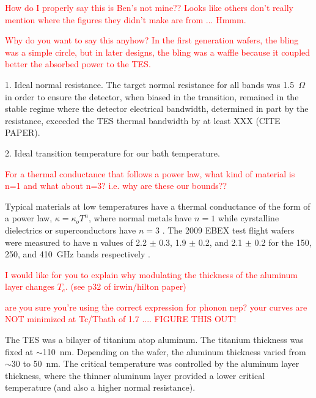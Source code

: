 \textcolor{red}{How do I properly say this is Ben's not mine?? Looks like others don't really mention where the figures they didn't make are from ... Hmmm.}

\textcolor{red}{Why do you want to say this anyhow? In the first generation wafers, the bling was a simple circle, but in later designs, the bling was a waffle because it coupled better the absorbed power to the \ac{TES}.}



1. Ideal normal resistance.  
The target normal resistance for all bands was 1.5~$\Omega$ in order to ensure the detector, when biased in the transition, remained in the stable regime where the detector electrical bandwidth, determined in part by the resistance, exceeded the \ac{TES} thermal bandwidth by at least XXX (CITE PAPER). 

2. Ideal transition temperature for our bath temperature. 


\textcolor{red}{For a thermal conductance that follows a power law, what kind of material is n=1 and what about n=3? i.e. why are these our bounds??}

Typical materials at low temperatures have a thermal conductance of the form of a power law, $\kappa = \kappa_o T^n$, where %
normal metals have $n=1$ while cyrstalline dielectrics or superconductors have $n=3$ \cite{Mather1982}. 
The 2009 \ac{EBEX} test flight wafers were measured to have n values of 2.2 $\pm$ 0.3, 1.9 $\pm$ 0.2, and 2.1 $\pm$ 0.2 for the 150, 250, and 410~GHz bands respectively \cite{Hubmayr2009}.

\textcolor{red}{I would like for you to explain why modulating the thickness of the aluminum layer changes $T_{c}$. (see p32 of irwin/hilton paper)}

\textcolor{red}{are you sure you're using the correct expression for phonon nep? your curves are NOT minimized at Tc/Tbath of 1.7 .... FIGURE THIS OUT!}


The \ac{TES} was a bilayer of titanium atop aluminum. 
The titanium thickness was fixed at $\sim$110~nm. 
Depending on the wafer, the aluminum thickness varied from $\sim$30 to 50~nm. 
The critical temperature was controlled by the aluminum layer thickness, where the thinner aluminum layer provided a lower critical temperature (and also a higher normal resistance). 


